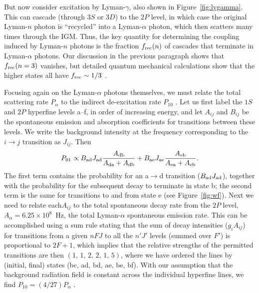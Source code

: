 But now consider excitation by Lyman-$\gamma$, also shown in Figure~\ref{fig:lygamma}.  This can cascade (through $3S$ or $3D$) to the $2P$ level, in which case the original Lyman-$n$ photon is ``recycled'' into a Lyman-$\alpha$ photon, which then scatters many times through the IGM.  Thus, the key quantity for determining the coupling induced by Lyman-$n$ photons is the fraction $f_{\rm rec}(n)$ of cascades that terminate in Lyman-$\alpha$ photons.  Our discussion in the previous paragraph shows that $f_{\rm rec}(n=3)$ vanishes, but detailed quantum mechanical calculations show that the higher states all have $f_{\rm rec} \sim 1/3$ \cite{hirata06, pritchard06}. 

Focusing again on the Lyman-$\alpha$ photons themselves, we must relate the total scattering rate $P_\alpha$ to the indirect de-excitation rate $P_{10}$ \cite{field58, meiksin00}. Let us first label the $1S$ and $2P$ hyperfine levels a--f, in order of increasing energy, and let $A_{ij}$ and $B_{ij}$ be the spontaneous emission and absorption coefficients for transitions between these levels.  We write the background intensity at the frequency corresponding to the $i \rightarrow j$ transition as $J_{ij}$.  Then
\begin{equation}
P_{01} \propto B_{\rm ad} J_{\rm ad} \frac{A_{\rm db}}{A_{\rm da} + A_{\rm db}} + B_{\rm ae} J_{\rm ae} \frac{A_{\rm eb}}{A_{\rm ea} + A_{\rm eb}}.\label{eq:psum}
\end{equation}
The first term contains the probability for an a$\rightarrow$d transition ($B_{\rm ad} J_{\rm ad}$), together with the probability for the subsequent decay to terminate in state b; the second term is the same for transitions to and from state e (see Figure~\ref{fig:wf}).  Next we need to relate each$A_{ij}$ to the total spontaneous decay rate from the $2P$ level, $A_\alpha = 6.25 \times 10^8$~Hz, the total Lyman-$\alpha$ spontaneous emission rate.  This can be accomplished using a sum rule stating that the sum of decay intensities ($g_i A_{ij}$) for transitions from a
given $nFJ$ to all the $n' J'$ levels (summed over $F'$) is proportional to $2F+1$, which implies that the relative strengths of the permitted transitions are then $(1,\,1,\,2,\,2,\,1,\,5)$, where we have ordered the lines by (initial, final) states (bc, ad, bd, ae, be, bf).  With our assumption that the background radiation field is constant across the individual hyperfine lines, we find $P_{10} = (4/27) P_\alpha$ \cite{meiksin00}.

